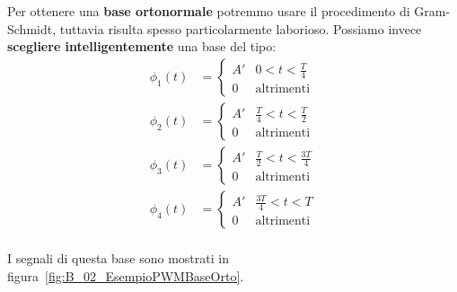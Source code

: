 Per ottenere una \textbf{base ortonormale} potremmo usare il
procedimento di Gram-Schmidt, tuttavia risulta spesso particolarmente
laborioso. Possiamo invece \textbf{scegliere intelligentemente} una base
del tipo:
\[
    \begin{aligned}
        \phi_{1}(t) &= \begin{cases}
            A' & 0 < t <\frac{T}{4} \\ 
            0 & \text{altrimenti}
        \end{cases} \\ 
        \phi_{2}(t) &= \begin{cases}
            A' & \frac{T}{4} < t <\frac{T}{2} \\ 
            0 & \text{altrimenti}
        \end{cases} \\ 
        \phi_{3}(t) &= \begin{cases}
            A' & \frac{T}{2} < t <\frac{3T}{4} \\ 
            0 & \text{altrimenti}
        \end{cases} \\ 
        \phi_{4}(t) &= \begin{cases}
            A' & \frac{3T}{4} < t < T \\ 
            0 & \text{altrimenti}
        \end{cases} \\ 
    \end{aligned}
\]

I segnali di questa base sono mostrati in figura~\ref{fig:B_02_EsempioPWMBaseOrto}.

